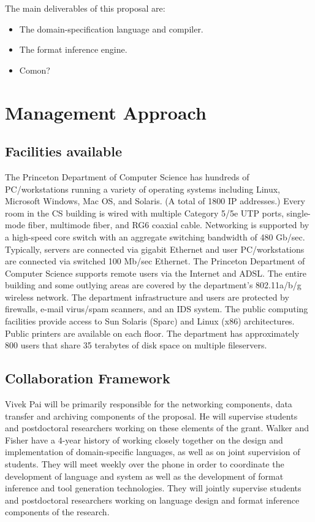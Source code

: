\documentclass[12pt]{article}
\begin{document}
The main deliverables of this proposal are:

\begin{itemize}
\item The \pads{} domain-specification language and compiler.
\item The \pads{} format inference engine.
\item Comon?
\end{itemize}

\section{Management Approach}

\subsection{Facilities available}

The Princeton Department of Computer Science has hundreds of
PC/workstations running a variety of operating systems including
Linux, Microsoft Windows, Mac OS, and Solaris. (A total of 1800 IP
addresses.) Every room in the CS building is wired with multiple
Category 5/5e UTP ports, single-mode fiber, multimode fiber, and RG6
coaxial cable. Networking is supported by a high-speed core switch
with an aggregate switching bandwidth of 480 Gb/sec. Typically,
servers are connected via gigabit Ethernet and user PC/workstations
are connected via switched 100 Mb/sec Ethernet. The Princeton
Department of Computer Science supports remote users via the Internet
and ADSL. The entire building and some outlying areas are covered by
the department's 802.11a/b/g wireless network. The department
infrastructure and users are protected by firewalls, e-mail virus/spam
scanners, and an IDS system. The public computing facilities provide
access to Sun Solaris (Sparc) and Linux (x86) architectures. Public
printers are available on each floor. The department has approximately
800 users that share 35 terabytes of disk space on multiple
fileservers.

\subsection{Collaboration Framework}

Vivek Pai will be primarily responsible for the networking components,
data transfer and archiving components of the proposal.  He will
supervise students and postdoctoral researchers working on these
elements of the grant.  Walker and Fisher
have a 4-year history of working closely together on the design
and implementation of domain-specific languages, as well as on joint
supervision of students.  They will meet weekly over the phone
in order to coordinate the development of \pads{} language and system
as well as the development of format inference and tool generation 
technologies.  They will jointly supervise students and postdoctoral
researchers working on language design and format inference components
of the research.
\end{document}
